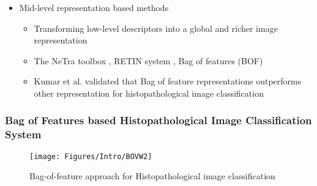 \documentclass [9pt,times] {beamer}
\begin{document}
\begin{frame}
\begin{itemize}
\begin{itemize}
			\item \textcolor[rgb]{0.00,0.00,1.00}{Mid-level representation based methods}
				\begin{itemize}
					\item  Transforming low-level descriptors into a global and richer image representation \\[0.1cm]
					\item The NeTra toolbox \cite{ma1999}, RETIN system \cite{fournier2001}, Bag of features (BOF) \cite{caicedo2009} \\[0.1cm]
 					\item \textcolor[rgb]{1.00,0.00,0.00}{Kumar et al. \cite{kumar2017} validated that Bag of feature representations outperforms other representation for histopathological image classification}

				\end{itemize}
			
			\end{itemize}



\end{itemize}
\end{frame}

\begin{frame}\frametitle{Bag of Features based Histopathological Image Classification System}
\begin{figure}
		\centering
		\texttt{[image: Figures/Intro/BOVW2]}
		\caption{Bag-of-feature approach for Histopathological image classification \cite{caicedo2009}}
		\label{fig:bof2}
	\end{figure}
\end{frame}
\end{document}
